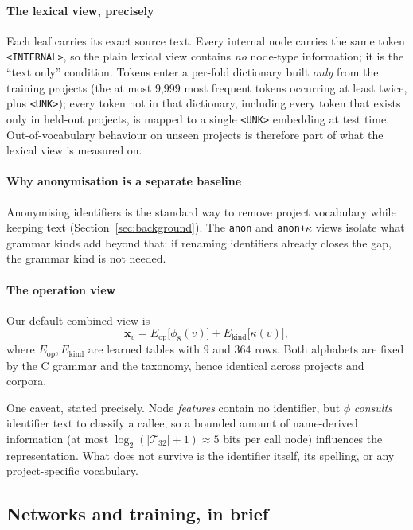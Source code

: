 \paragraph{The lexical view, precisely} Each leaf carries its exact source
text. Every internal node carries the same token \texttt{<INTERNAL>}, so the
plain lexical view contains \emph{no} node-type information; it is the
``text only'' condition. Tokens enter a per-fold dictionary built \emph{only}
from the training projects (the at most 9{,}999 most frequent tokens occurring at
least twice, plus \texttt{<UNK>}); every token not in that dictionary, including every token that
exists only in held-out projects, is mapped to a single \texttt{<UNK>}
embedding at test time. Out-of-vocabulary behaviour on unseen projects is
therefore part of what the lexical view is measured on.

\paragraph{Why anonymisation is a separate baseline} Anonymising identifiers
is the standard way to remove project vocabulary while keeping text
(Section~\ref{sec:background}). The \texttt{anon} and \texttt{anon+$\kappa$}
views isolate what grammar kinds add beyond that: if renaming identifiers
already closes the gap, the grammar kind is not needed.

\paragraph{The operation view} Our default combined view is
\begin{equation}
    \mathbf{x}_v = E_{\mathrm{op}}\big[\phi_8(v)\big]
                 + E_{\mathrm{kind}}\big[\kappa(v)\big],
\label{eq:features}
\end{equation}
where $E_{\mathrm{op}},E_{\mathrm{kind}}$ are learned tables with $9$ and $364$
rows. Both alphabets are fixed by the C grammar and the taxonomy, hence
identical across projects and corpora.

One caveat, stated precisely. Node \emph{features} contain no identifier, but
$\phi$ \emph{consults} identifier text to classify a callee, so a bounded
amount of name-derived information (at most
$\log_2(|\mathcal{T}_{32}|+1) \approx 5$ bits per call node) influences the
representation. What does not survive is the identifier itself, its spelling,
or any project-specific vocabulary.

\subsection{Networks and training, in brief}
\label{sec:networks}

